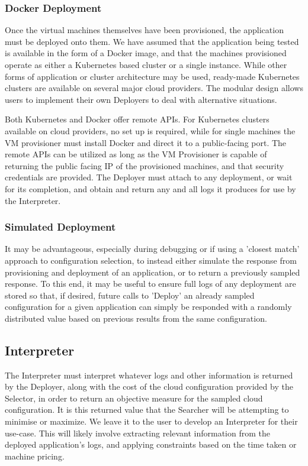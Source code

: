 \documentclass{article}
\begin{document}
\subsubsection{Docker Deployment}
Once the virtual machines themselves have been provisioned, the application must be deployed onto them. We have assumed that the application being tested is available in the form of a Docker image, and that the machines provisioned operate as either a Kubernetes based cluster or a single instance. While other forms of application or cluster architecture may be used, ready-made Kubernetes clusters are available on several major cloud providers. The modular design allows users to implement their own Deployers to deal with alternative situations. 

Both Kubernetes and Docker offer remote APIs. For Kubernetes clusters available on cloud providers, no set up is required, while for single machines the VM provisioner must install Docker and direct it to a public-facing port. The remote APIs can be utilized as long as the VM Provisioner is capable of returning the public facing IP of the provisioned machines, and that security credentials are provided. The Deployer must attach to any deployment, or wait for its completion, and obtain and return any and all logs it produces for use by the Interpreter.

\subsubsection{Simulated Deployment}
It may be advantageous, especially during debugging or if using a 'closest match' approach to configuration selection, to instead either simulate the response from provisioning and deployment of an application, or to return a previously sampled response. To this end, it may be useful to ensure full logs of any deployment are stored so that, if desired, future calls to 'Deploy' an already sampled configuration for a given application can simply be responded with a randomly distributed value based on previous results from the same configuration.

\subsection{Interpreter}
The Interpreter must interpret whatever logs and other information is returned by the Deployer, along with the cost of the cloud configuration provided by the Selector, in order to return an objective measure for the sampled cloud configuration. It is this returned value that the Searcher will be attempting to minimise or maximize. We leave it to the user to develop an Interpreter for their use-case. This will likely involve extracting relevant information from the deployed application's logs, and applying constraints based on the time taken or machine pricing. 
\end{document}

